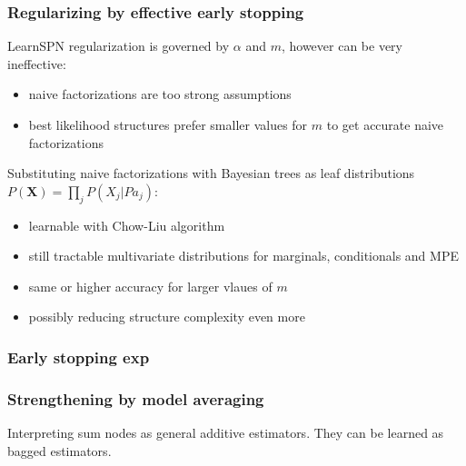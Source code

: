 \documentclass[xcolor={usenames,dvipsnames,svgnames}, compress]{beamer}
\begin{document}
\begin{frame}
  \frametitle{Regularizing by effective early stopping}
  \footnotesize
  LearnSPN regularization is governed by $\alpha$ and $m$, however can
  be very ineffective:
  \begin{itemize}
  \item naive factorizations are too strong assumptions
    \item best likelihood structures prefer smaller values for $m$ to
      get accurate naive factorizations
    \end{itemize}\bigskip

    Substituting naive factorizations with Bayesian trees as leaf
    distributions $P(\mathbf{X}) = \prod_{j}P(X_j|Pa_{j})$:
    \begin{itemize}
    \item learnable with Chow-Liu algorithm
    \item still tractable multivariate distributions for marginals,
      conditionals and MPE
    \item same or higher accuracy for larger vlaues of $m$
    \item possibly reducing structure complexity even more  
    \end{itemize}
\end{frame}

\begin{frame}
  \frametitle{Early stopping exp}
\end{frame}

\begin{frame}
  \frametitle{Strengthening by model averaging}
  \footnotesize
  Interpreting sum nodes as general additive estimators. They can be
  learned as bagged estimators.
\end{frame}
\end{document}
